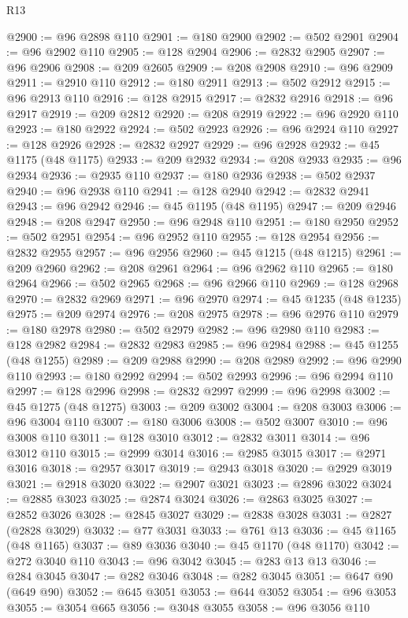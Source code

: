 \begin{lexlean}{R13}
\begin{coremodule}
{{{{{{{{{{{{{{{{{{{{{{{{{{{{{{{{{{{{{{{{{{{{{{{{{{{{{{{{{{{{{{{{{{{{{{{{{{{{{{{{{{{{{{{{{{{{{{{{{{{{{{{{{{@2900 := @96 @2898 @110
@2901 := @180 @2900
@2902 := @502 @2901
@2904 := @96 @2902 @110
@2905 := @128 @2904
@2906 := @2832 @2905
@2907 := @96 @2906
@2908 := @209 @2605
@2909 := @208 @2908
@2910 := @96 @2909
@2911 := @2910 @110
@2912 := @180 @2911
@2913 := @502 @2912
@2915 := @96 @2913 @110
@2916 := @128 @2915
@2917 := @2832 @2916
@2918 := @96 @2917
@2919 := @209 @2812
@2920 := @208 @2919
@2922 := @96 @2920 @110
@2923 := @180 @2922
@2924 := @502 @2923
@2926 := @96 @2924 @110
@2927 := @128 @2926
@2928 := @2832 @2927
@2929 := @96 @2928
@2932 := @45 @1175 (@48 @1175)
@2933 := @209 @2932
@2934 := @208 @2933
@2935 := @96 @2934
@2936 := @2935 @110
@2937 := @180 @2936
@2938 := @502 @2937
@2940 := @96 @2938 @110
@2941 := @128 @2940
@2942 := @2832 @2941
@2943 := @96 @2942
@2946 := @45 @1195 (@48 @1195)
@2947 := @209 @2946
@2948 := @208 @2947
@2950 := @96 @2948 @110
@2951 := @180 @2950
@2952 := @502 @2951
@2954 := @96 @2952 @110
@2955 := @128 @2954
@2956 := @2832 @2955
@2957 := @96 @2956
@2960 := @45 @1215 (@48 @1215)
@2961 := @209 @2960
@2962 := @208 @2961
@2964 := @96 @2962 @110
@2965 := @180 @2964
@2966 := @502 @2965
@2968 := @96 @2966 @110
@2969 := @128 @2968
@2970 := @2832 @2969
@2971 := @96 @2970
@2974 := @45 @1235 (@48 @1235)
@2975 := @209 @2974
@2976 := @208 @2975
@2978 := @96 @2976 @110
@2979 := @180 @2978
@2980 := @502 @2979
@2982 := @96 @2980 @110
@2983 := @128 @2982
@2984 := @2832 @2983
@2985 := @96 @2984
@2988 := @45 @1255 (@48 @1255)
@2989 := @209 @2988
@2990 := @208 @2989
@2992 := @96 @2990 @110
@2993 := @180 @2992
@2994 := @502 @2993
@2996 := @96 @2994 @110
@2997 := @128 @2996
@2998 := @2832 @2997
@2999 := @96 @2998
@3002 := @45 @1275 (@48 @1275)
@3003 := @209 @3002
@3004 := @208 @3003
@3006 := @96 @3004 @110
@3007 := @180 @3006
@3008 := @502 @3007
@3010 := @96 @3008 @110
@3011 := @128 @3010
@3012 := @2832 @3011
@3014 := @96 @3012 @110
@3015 := @2999 @3014
@3016 := @2985 @3015
@3017 := @2971 @3016
@3018 := @2957 @3017
@3019 := @2943 @3018
@3020 := @2929 @3019
@3021 := @2918 @3020
@3022 := @2907 @3021
@3023 := @2896 @3022
@3024 := @2885 @3023
@3025 := @2874 @3024
@3026 := @2863 @3025
@3027 := @2852 @3026
@3028 := @2845 @3027
@3029 := @2838 @3028
@3031 := @2827 (@2828 @3029)
@3032 := @77 @3031
@3033 := @761 @13
@3036 := @45 @1165 (@48 @1165)
@3037 := @89 @3036
@3040 := @45 @1170 (@48 @1170)
@3042 := @272 @3040 @110
@3043 := @96 @3042
@3045 := @283 @13 @13
@3046 := @284 @3045
@3047 := @282 @3046
@3048 := @282 @3045
@3051 := @647 @90 (@649 @90)
@3052 := @645 @3051
@3053 := @644 @3052
@3054 := @96 @3053
@3055 := @3054 @665
@3056 := @3048 @3055
@3058 := @96 @3056 @110
}}}}}}}}}}}}}}}}}}}}}}}}}}}}}}}}}}}}}}}}}}}}}}}}}}}}}}}}}}}}}}}}}}}}}}}}}}}}}}}}}}}}}}}}}}}}}}}}}}}}}}}}}}
\end{coremodule}
\end{lexlean}
